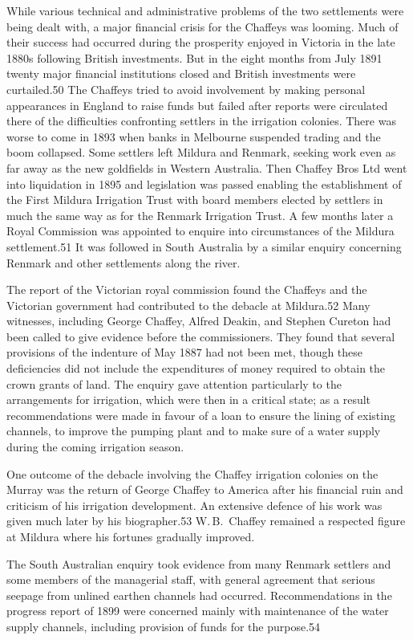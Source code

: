 While various technical and administrative problems of the two
settlements were being dealt with, a major financial crisis for the
Chaffeys was looming.  Much of their success had occurred during the
prosperity enjoyed in Victoria in the late 1880s following British
investments.  But in the eight months from July 1891 twenty major
financial institutions closed and British investments were
curtailed.50 The Chaffeys tried to avoid involvement by making
personal appearances in England to raise funds but failed after
reports were circulated there of the difficulties confronting settlers
in the irrigation colonies.  There was worse to come in 1893 when
banks in Melbourne suspended trading and the boom collapsed.  Some
settlers left Mildura and Renmark, seeking work even as far away as
the new goldfields in Western Australia.  Then Chaffey Bros Ltd went
into liquidation in 1895 and legislation was passed enabling the
establishment of the First Mildura Irrigation Trust with board members
elected by settlers in much the same way as for the Renmark Irrigation
Trust.  A few months later a Royal Commission was appointed to enquire
into circumstances of the Mildura settlement.51 It was followed in
South Australia by a similar enquiry concerning Renmark and other
settlements along the river.

The report of the Victorian royal commission found the Chaffeys and
the Victorian government had contributed to the debacle at Mildura.52
Many witnesses, including George Chaffey, Alfred Deakin, and Stephen
Cureton had been called to give evidence before the commissioners.
They found that several provisions of the indenture of May 1887 had
not been met, though these deficiencies did not include the
expenditures of money required to obtain the crown grants of land.
The enquiry gave attention particularly to the arrangements for
irrigation, which were then in a critical state; as a result
recommendations were made in favour of a loan to ensure the lining of
existing channels, to improve the pumping plant and to make sure of a
water supply during the coming irrigation season.

One outcome of the debacle involving the Chaffey irrigation colonies
on the Murray was the return of George Chaffey to America after his
financial ruin and criticism of his irrigation development.  An
extensive defence of his work was given much later by his
biographer.53 W.\,B.~Chaffey remained a respected figure at Mildura
where his fortunes gradually improved.

The South Australian enquiry took evidence from many Renmark settlers
and some members of the managerial staff, with general agreement that
serious seepage from unlined earthen channels had occurred.
Recommendations in the progress report of 1899 were concerned mainly
with maintenance of the water supply channels, including provision of
funds for the purpose.54

